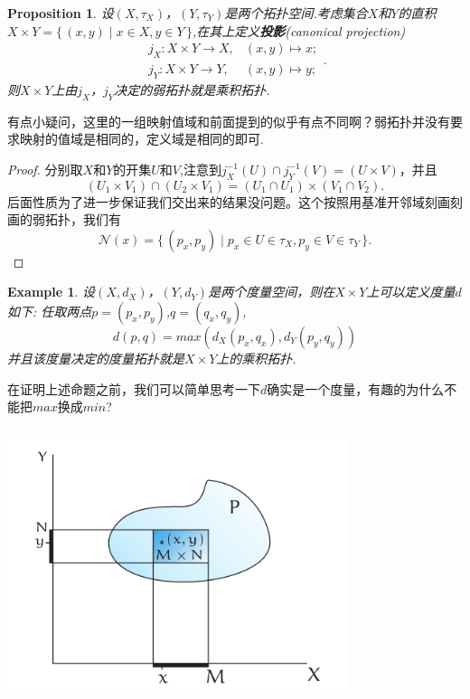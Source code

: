 \documentclass{article}
\newtheorem{proposition}[theorem]{Proposition}
\newtheorem{example}[theorem]{Example}
\newcommand*{\xfunc}[4]{{#2}\colon{#3}{#1}{#4}}
\newcommand*{\func}[3]{\xfunc{\to}{#1}{#2}{#3}}
\newcommand\Set[2]{\{\,#1\mid#2\,\}} %
\begin{document}
\begin{proposition}
设$(X,\tau_X)$，$(Y,\tau_Y)$是两个拓扑空间.考虑集合$X$和$Y$的直积$X \times Y=\Set{(x,y)}{x \in X,y \in Y}$,在其上定义\textbf{投影}(canonical  projection)\[\begin{aligned}
			\func{j_X}{X \times Y}{X} ,& (x,y) \mapsto x;\\
			\func{j_Y}{X \times Y}{Y} ,& (x,y) \mapsto y; 
			\end{aligned}.	
			\]则$X \times Y$上由$j_X$，$j_Y$决定的弱拓扑就是乘积拓扑.		
\end{proposition}

有点小疑问，这里的一组映射值域和前面提到的似乎有点不同啊？弱拓扑并没有要求映射的值域是相同的，定义域是相同的即可.

\begin{proof}
分别取$X$和$Y$的开集$U$和$V$,注意到$j_X^{-1}(U) \cap j_Y^{-1}(V)=(U \times V)$，并且\[(U_1 \times V_1) \cap (U_2 \times V_1)=(U_1 \cap U_1)\times (V_1 \cap V_2).\]后面性质为了进一步保证我们交出来的结果没问题。这个按照用基准开邻域刻画刻画的弱拓扑，我们有\[\mathcal{N}(x)=\Set{(p_x,p_y)}{p_x \in U \in \tau_X,p_y \in V \in \tau_Y}.\]
\end{proof}

\begin{example}
设$(X,d_X)$，$(Y,d_Y)$是两个度量空间，则在$X \times Y$上可以定义度量$d$如下: 任取两点$p=(p_x,p_y)$,$q=(q_x,q_y)$,\[d(p,q)=max(d_X(p_x,q_x),d_Y(p_y,q_y))\]并且该度量决定的度量拓扑就是$X \times Y$上的乘积拓扑.
\end{example}

在证明上述命题之前，我们可以简单思考一下$d$确实是一个度量，有趣的为什么不能把$max$换成$min$?

\begin{center}
\includegraphics[width=10cm, height=8cm]{images/product_topology.png}
\end{center}
\end{document}
